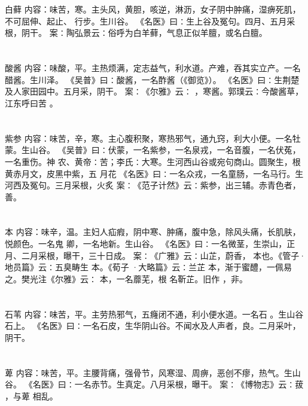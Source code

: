 \documentclass[12pt,UTF8]{ctexbook}
\begin{document}
\chapter{}白藓
内容：味苦，寒。主头风，黄胆，咳逆，淋沥，女子阴中肿痛，湿痹死肌，不可屈伸、起止、 
行步。生川谷。 
《名医》曰∶生上谷及冤句。四月、五月采根，阴干。 
案∶陶弘景云∶俗呼为白羊藓，气息正似羊膻，或名白膻。 


\chapter{}酸酱
内容：味酸，平。主热烦满，定志益气，利水道。产难，吞其实立产。一名醋酱。生川泽。 
《吴普》曰∶酸酱，一名酢酱（《御览》）。 
《名医》曰∶生荆楚及人家田园中。五月采，阴干。 
案∶《尔雅》云∶ ，寒酱。郭璞云∶今酸酱草，江东呼曰苦 。 


\chapter{}紫参
内容：味苦，辛，寒。主心腹积聚，寒热邪气，通九窍，利大小便。一名牡蒙。生山谷。 
《吴普》曰∶伏蒙，一名紫参，一名泉戎，一名音腹，一名伏菟，一名重伤。神 
农、黄帝∶苦；李氏∶大寒。生河西山谷或宛句商山。圆聚生，根黄赤月文，皮黑中紫，五 
月花 
《名医》曰∶一名众戎，一名童肠，一名马行。生河西及冤句。三月采根，火炙 
案∶《范子计然》云∶紫参，出三辅。赤青色者，善。 


\chapter{}本
内容：味辛，温。主妇人疝瘕，阴中寒、肿痛，腹中急，除风头痛，长肌肤，悦颜色。一名鬼 
卿，一名地新。生山谷。 
《名医》曰∶一名微茎，生崇山，正月、二月采根，曝干，三十日成。 
案∶《广雅》云∶山芷，蔚香， 本也。《管子·地员篇》云∶五臭畴生 本。《荀子 
·大略篇》云∶兰芷 本，渐于蜜醴，一佩易之。樊光注《尔雅》云∶ 本，一名蘼芜，根 
名靳芷。旧作 ，非。 


\chapter{}石苇
内容：味苦，平。主劳热邪气，五癃闭不通，利小便水道。一名石 。生山谷石上。 
《名医》曰∶一名石皮，生华阴山谷。不闻水及人声者，良。二月采叶，阴干。 


\chapter{}萆
内容：味苦，平。主腰背痛，强骨节，风寒湿、周痹，恶创不瘳，热气。生山谷。 
《名医》曰∶一名赤节。生真定。八月采根，曝干。 
案∶《博物志》云∶菝 ，与萆 相乱。 
\end{document}
